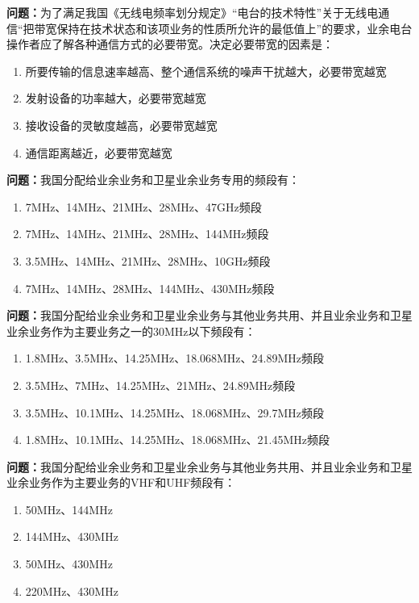 \bigskip


\noindent\textbf{问题：}为了满足我国《无线电频率划分规定》“电台的技术特性”关于无线电通信“把带宽保持在技术状态和该项业务的性质所允许的最低值上”的要求，业余电台操作者应了解各种通信方式的必要带宽。决定必要带宽的因素是：
\begin{enumerate}[label=\Alph*), leftmargin=3em]
\item 所要传输的信息速率越高、整个通信系统的噪声干扰越大，必要带宽越宽
\item 发射设备的功率越大，必要带宽越宽
\item 接收设备的灵敏度越高，必要带宽越宽
\item 通信距离越近，必要带宽越宽
\end{enumerate}

\bigskip


\noindent\textbf{问题：}我国分配给业余业务和卫星业余业务专用的频段有：
\begin{enumerate}[label=\Alph*), leftmargin=3em]
\item 7MHz、14MHz、21MHz、28MHz、47GHz频段
\item 7MHz、14MHz、21MHz、28MHz、144MHz频段
\item 3.5MHz、14MHz、21MHz、28MHz、10GHz频段
\item 7MHz、14MHz、28MHz、144MHz、430MHz频段
\end{enumerate}

\bigskip


\noindent\textbf{问题：}我国分配给业余业务和卫星业余业务与其他业务共用、并且业余业务和卫星业余业务作为主要业务之一的30MHz以下频段有：
\begin{enumerate}[label=\Alph*), leftmargin=3em]
\item 1.8MHz、3.5MHz、14.25MHz、18.068MHz、24.89MHz频段
\item 3.5MHz、7MHz、14.25MHz、21MHz、24.89MHz频段
\item 3.5MHz、10.1MHz、14.25MHz、18.068MHz、29.7MHz频段
\item 1.8MHz、10.1MHz、14.25MHz、18.068MHz、21.45MHz频段
\end{enumerate}

\bigskip


\noindent\textbf{问题：}我国分配给业余业务和卫星业余业务与其他业务共用、并且业余业务和卫星业余业务作为主要业务的VHF和UHF频段有：
\begin{enumerate}[label=\Alph*), leftmargin=3em]
\item 50MHz、144MHz
\item 144MHz、430MHz
\item 50MHz、430MHz
\item 220MHz、430MHz
\end{enumerate}

